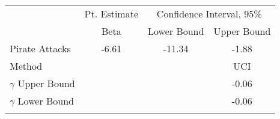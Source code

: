 \begin{center}
\begin{tabular}{lccc}
\hline \noalign{\smallskip} & Pt. Estimate & \multicolumn{2}{c}{Confidence Interval, 95\%}\\
 & Beta & Lower Bound & Upper Bound\\
\noalign{\smallskip}\hline \noalign{\smallskip}Pirate Attacks & -6.61 & -11.34 & -1.88\\
\hline Method &  &  & UCI\\
$\gamma$ Upper Bound &  &  & -0.06\\
$\gamma$ Lower Bound &  &  & -0.06\\
\noalign{\smallskip}\end{tabular}\\
\end{center}

